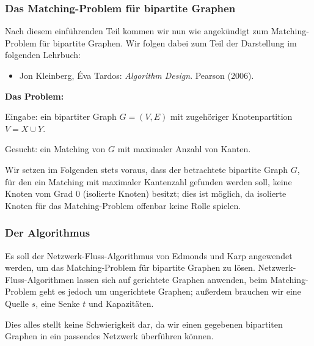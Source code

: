 \documentclass[smaller]{beamer}
\begin{document}
\begin{frame}
 \frametitle{Das Matching-Problem für bipartite Graphen}
 Nach diesem einführenden Teil kommen wir nun wie angekündigt zum \alert{Matching-Problem für bipartite Graphen}. Wir folgen dabei zum Teil der Darstellung im folgenden Lehrbuch:
\begin{itemize}
\item Jon Kleinberg, Éva Tardos: \textit{Algorithm Design}. Pearson (2006).
\end{itemize} \vspace*{0.2cm}

\textbf{Das Problem:} \\ \vspace*{0.2cm}

\alert{Eingabe:} ein bipartiter Graph $G=(V,E)$ mit zugehöriger Knotenpartition $V = X \cup Y$. \\ \vspace*{0.2cm}

\alert{Gesucht:} ein Matching von $G$ mit maximaler Anzahl von Kanten. \\ \vspace*{0.2cm}

Wir setzen im Folgenden stets voraus, dass der betrachtete bipartite Graph $G$, für den ein Matching mit maximaler Kantenzahl gefunden werden soll, keine Knoten vom Grad 0 (\alert{{\glqq}isolierte Knoten{\grqq}}) besitzt; dies ist möglich, da isolierte Knoten für das Matching-Problem offenbar keine Rolle spielen.
\end{frame}

\begin{frame}
 \frametitle{Der Algorithmus}
 Es soll der \alert{Netzwerk-Fluss-Algorithmus} von Edmonds und Karp angewendet werden, um das Matching-Problem für bipartite Graphen zu lösen. Netzwerk-Fluss-Algorithmen lassen sich auf \alert{gerichtete} Graphen anwenden, beim Matching-Problem geht es jedoch um \alert{ungerichtete} Graphen; außerdem brauchen wir eine \alert{Quelle} $s$, eine \alert{Senke} $t$ und \alert{Kapazitäten}. \\ \vspace*{0.2cm}

Dies alles stellt keine Schwierigkeit dar, da wir einen gegebenen bipartiten Graphen in ein passendes Netzwerk überführen können.
\end{frame}
\end{document}
